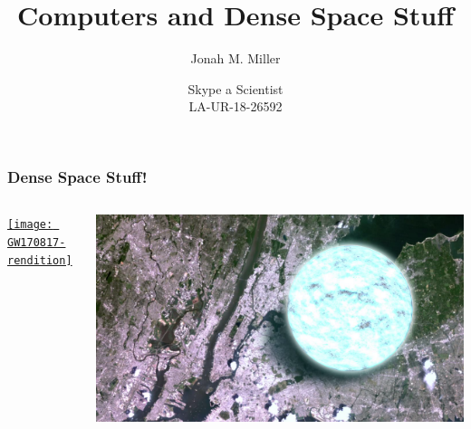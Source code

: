 \documentclass[]{beamer}
\title[SSAS]{Computers and Dense Space Stuff}
\author[J. Miller]{Jonah M. Miller}
\institute[LANL]{Los Alamos National Lab}
\date[10/22/18]{Skype a Scientist\\LA-UR-18-26592}
\begin{document}
\begin{frame}[plain]
\titlepage
\end{frame}

\begin{frame}
  \frametitle{Dense Space Stuff!}
  \begin{columns}
    \begin{column}{5cm}
      \begin{center}
        \href{https://youtu.be/e7LcmWiclOs}{\texttt{[image: GW170817-rendition]}}
      \end{center}
    \end{column}
    \begin{column}{7cm}
    \includegraphics[width=\columnwidth]{ns-manhattan}  
    \end{column}
  \end{columns}
\end{frame}

\end{document}
